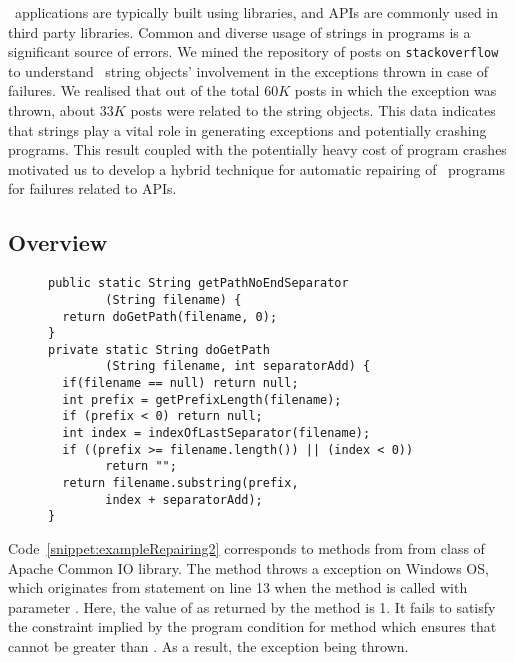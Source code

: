 \java\ applications are typically built using libraries, and  APIs
are commonly used in third party libraries. Common and diverse usage of strings
in programs is a significant source of errors. We mined the repository of posts
on \texttt{stackoverflow}~\cite{stackoverflow} to understand \java\ string objects'
involvement in the exceptions thrown in case of failures. We realised that out
of the total $60K$ posts in which the exception was thrown, about $33K$ posts were
related to the \java string objects. This data indicates that strings play a vital
role in generating exceptions and potentially crashing programs. This result
coupled with the potentially
heavy cost of program crashes motivated us to develop a hybrid technique for
automatic repairing of \java\ programs for failures related to 
APIs.

\subsection{Overview}
\label{subsec:overview}

\begin{figure}[t]
\centering
\begin{lstlisting}
public static String getPathNoEndSeparator
        (String filename) {
  return doGetPath(filename, 0);
}
private static String doGetPath
        (String filename, int separatorAdd) {
  if(filename == null) return null;
  int prefix = getPrefixLength(filename);
  if (prefix < 0) return null;
  int index = indexOfLastSeparator(filename);
  if ((prefix >= filename.length()) || (index < 0))
        return "";
  return filename.substring(prefix,
        index + separatorAdd);
}
\end{lstlisting}
\end{figure}

Code~\ref{snippet:exampleRepairing2} corresponds to methods from from
 class of Apache Common IO library. The method
 throws a  exception
on Windows OS, which originates from statement  on line 13 when the method is
called with parameter .  Here, the value of  as
returned by the method  is 1. It fails to satisfy the
constraint implied by the program condition  for  method which  ensures that 
cannot be greater than . As a result, the exception being thrown.


